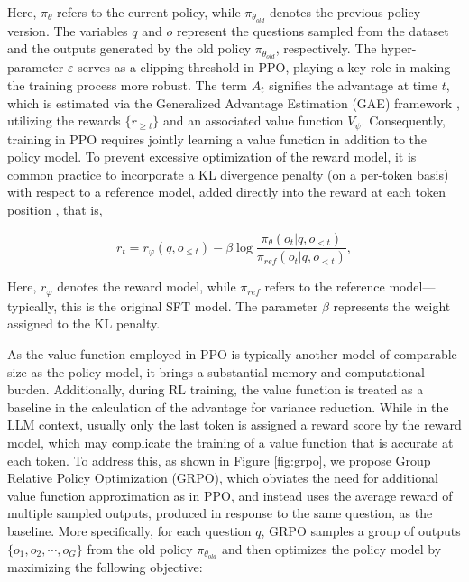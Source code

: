 \begin{itemize}[topsep=0pt]
Here, $\pi_{\theta}$ refers to the current policy, while $\pi_{\theta_{old}}$ denotes the previous policy version. The variables $q$ and $o$ represent the questions sampled from the dataset and the outputs generated by the old policy $\pi_{\theta_{old}}$, respectively. The hyper-parameter $\varepsilon$ serves as a clipping threshold in PPO, playing a key role in making the training process more robust. The term $A_t$ signifies the advantage at time $t$, which is estimated via the Generalized Advantage Estimation (GAE) framework \citep{gae}, utilizing the rewards $\{r_{\ge t}\}$ and an associated value function $V_{\psi}$. Consequently, training in PPO requires jointly learning a value function in addition to the policy model. To prevent excessive optimization of the reward model, it is common practice to incorporate a KL divergence penalty (on a per-token basis) with respect to a reference model, added directly into the reward at each token position \citep{ouyang2022training}, that is,

\begin{equation}
    r_{t} = r_\varphi(q, o_{\le t}) - \beta \log\frac{\pi_{\theta}(o_{t}|q, o_{<t})}{\pi_{ref}(o_{t}|q, o_{<t})},
\label{eq:PPO-reward}
\end{equation}

Here, $r_\varphi$ denotes the reward model, while $\pi_{ref}$ refers to the reference model—typically, this is the original SFT model. The parameter $\beta$ represents the weight assigned to the KL penalty.

As the value function employed in PPO is typically another model of comparable size as the policy model, it brings a substantial memory and computational burden. Additionally, during RL training, the value function is treated as a baseline in the calculation of the advantage for variance reduction. While in the LLM context, usually only the last token is assigned a reward score by the reward model, which may complicate the training of a value function that is accurate at each token. To address this, as shown in Figure \ref{fig:grpo}, we propose Group Relative Policy Optimization (GRPO), which obviates the need for additional value function approximation as in PPO, and instead uses the average reward of multiple sampled outputs, produced in response to the same question, as the baseline. More specifically, for each question $q$, GRPO samples a group of outputs $\{o_1, o_2, \cdots, o_G\}$  from the old policy  $\pi_{\theta_{old}}$  and then optimizes the policy model by maximizing the following objective:


\end{itemize}
